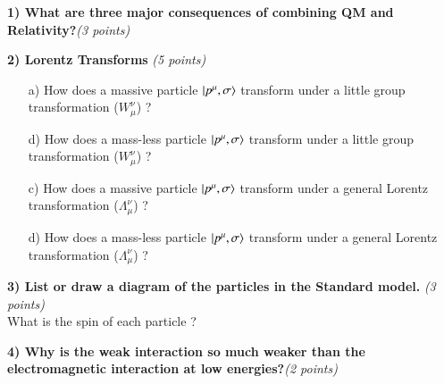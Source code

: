 {\large


\textbf{1) What are three major consequences of combining QM and Relativity?}\hfill \textit{(3 points)}\\

\vspace{3in}


\textbf{2) Lorentz Transforms } \hfill \textit{(5 points)}\\
\begin{itemize}
\item[a)] How does a massive particle $\ket{p^\mu,\sigma}$ transform under a little group transformation ($W_\mu^\nu$)  ?
\vspace*{1in}
\item[d)] How does a mass-less particle $\ket{p^\mu,\sigma}$ transform under a little group transformation ($W_\mu^\nu$)  ?
\vspace*{1in}
\item[c)] How does a massive particle $\ket{p^\mu,\sigma}$ transform under a general Lorentz transformation ($\Lambda_\mu^\nu$)  ?
\vspace*{1in}
\item[d)] How does a mass-less particle $\ket{p^\mu,\sigma}$ transform under a general Lorentz transformation ($\Lambda_\mu^\nu$)  ?
\vspace*{1in}

\end{itemize}


\textbf{3) List or draw a diagram of the particles in the Standard model. } \hfill \textit{(3 points)}\\
What is the spin of each particle ?

\vspace*{3in}


\textbf{4) Why is the weak interaction so much weaker than the electromagnetic interaction at low energies?}\hfill \textit{(2 points)}\\

\vspace{2in}







}
